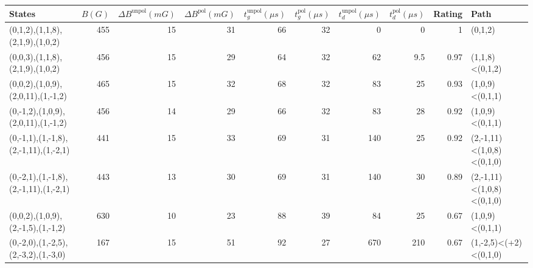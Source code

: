 \begin{tabular}{lrrrrrrrrl}
\hline
 {States}                             &   {$B(G)$} &   {$\Delta B^{\text{unpol}}(mG)$} &   {$\Delta B^{\text{pol}}(mG)$} &   {$t^{\text{unpol}}_{g}(\mu s)$} &   {$t^{\text{pol}}_{g}(\mu s)$} &   {$t^{\text{unpol}}_{d}(\mu s)$} &   {$t^{\text{pol}}_{d}(\mu s)$} &   {Rating} & {Path}                    \\
\hline
 (0,1,2),(1,1,8),(2,1,9),(1,0,2)      &        455 &                                15 &                              31 &                                66 &                              32 &                                 0 &                             0   &       1    & (0,1,2)                   \\
 (0,0,3),(1,1,8),(2,1,9),(1,0,2)      &        456 &                                15 &                              29 &                                64 &                              32 &                                62 &                             9.5 &       0.97 & (1,1,8)<(0,1,2)           \\
 (0,0,2),(1,0,9),(2,0,11),(1,-1,2)    &        465 &                                15 &                              32 &                                68 &                              32 &                                83 &                            25   &       0.93 & (1,0,9)<(0,1,1)           \\
 (0,-1,2),(1,0,9),(2,0,11),(1,-1,2)   &        456 &                                14 &                              29 &                                66 &                              32 &                                83 &                            28   &       0.92 & (1,0,9)<(0,1,1)           \\
 (0,-1,1),(1,-1,8),(2,-1,11),(1,-2,1) &        441 &                                15 &                              33 &                                69 &                              31 &                               140 &                            25   &       0.92 & (2,-1,11)<(1,0,8)<(0,1,0) \\
 (0,-2,1),(1,-1,8),(2,-1,11),(1,-2,1) &        443 &                                13 &                              30 &                                69 &                              31 &                               140 &                            30   &       0.89 & (2,-1,11)<(1,0,8)<(0,1,0) \\
 (0,0,2),(1,0,9),(2,-1,5),(1,-1,2)    &        630 &                                10 &                              23 &                                88 &                              39 &                                84 &                            25   &       0.67 & (1,0,9)<(0,1,1)           \\
 (0,-2,0),(1,-2,5),(2,-3,2),(1,-3,0)  &        167 &                                15 &                              51 &                                92 &                              27 &                               670 &                           210   &       0.67 & (1,-2,5)<(+2)<(0,1,0)     \\
\hline
\end{tabular}